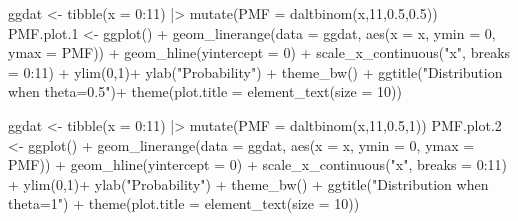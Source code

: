 \documentclass[
]{article}
\newenvironment{Shaded}{\begin{snugshade}}{\end{snugshade}}
\newcommand{\AttributeTok}[1]{\textcolor[rgb]{0.40,0.45,0.13}{#1}}
\newcommand{\DecValTok}[1]{\textcolor[rgb]{0.68,0.00,0.00}{#1}}
\newcommand{\FloatTok}[1]{\textcolor[rgb]{0.68,0.00,0.00}{#1}}
\newcommand{\FunctionTok}[1]{\textcolor[rgb]{0.28,0.35,0.67}{#1}}
\newcommand{\NormalTok}[1]{\textcolor[rgb]{0.00,0.23,0.31}{#1}}
\newcommand{\OtherTok}[1]{\textcolor[rgb]{0.00,0.23,0.31}{#1}}
\newcommand{\SpecialCharTok}[1]{\textcolor[rgb]{0.37,0.37,0.37}{#1}}
\newcommand{\StringTok}[1]{\textcolor[rgb]{0.13,0.47,0.30}{#1}}
\begin{document}
\begin{Shaded}
\begin{Highlighting}[numbers=left,,]
\NormalTok{ggdat }\OtherTok{\textless{}{-}} \FunctionTok{tibble}\NormalTok{(}\AttributeTok{x =} \DecValTok{0}\SpecialCharTok{:}\DecValTok{11}\NormalTok{) }\SpecialCharTok{|\textgreater{}}
  \FunctionTok{mutate}\NormalTok{(}\AttributeTok{PMF =} \FunctionTok{daltbinom}\NormalTok{(x,}\DecValTok{11}\NormalTok{,}\FloatTok{0.5}\NormalTok{,}\FloatTok{0.5}\NormalTok{))}
\NormalTok{PMF.plot}\FloatTok{.1} \OtherTok{\textless{}{-}} \FunctionTok{ggplot}\NormalTok{() }\SpecialCharTok{+}
  \FunctionTok{geom\_linerange}\NormalTok{(}\AttributeTok{data =}\NormalTok{ ggdat,}
                 \FunctionTok{aes}\NormalTok{(}\AttributeTok{x =}\NormalTok{ x, }\AttributeTok{ymin =} \DecValTok{0}\NormalTok{, }\AttributeTok{ymax =}\NormalTok{ PMF)) }\SpecialCharTok{+}
  \FunctionTok{geom\_hline}\NormalTok{(}\AttributeTok{yintercept =} \DecValTok{0}\NormalTok{) }\SpecialCharTok{+}
  \FunctionTok{scale\_x\_continuous}\NormalTok{(}\StringTok{"x"}\NormalTok{, }\AttributeTok{breaks =} \DecValTok{0}\SpecialCharTok{:}\DecValTok{11}\NormalTok{) }\SpecialCharTok{+}
  \FunctionTok{ylim}\NormalTok{(}\DecValTok{0}\NormalTok{,}\DecValTok{1}\NormalTok{)}\SpecialCharTok{+}
  \FunctionTok{ylab}\NormalTok{(}\StringTok{"Probability"}\NormalTok{) }\SpecialCharTok{+}
  \FunctionTok{theme\_bw}\NormalTok{() }\SpecialCharTok{+}
  \FunctionTok{ggtitle}\NormalTok{(}\StringTok{"Distribution when theta=0.5"}\NormalTok{)}\SpecialCharTok{+}
  \FunctionTok{theme}\NormalTok{(}\AttributeTok{plot.title =} \FunctionTok{element\_text}\NormalTok{(}\AttributeTok{size =} \DecValTok{10}\NormalTok{))}

\NormalTok{ggdat }\OtherTok{\textless{}{-}} \FunctionTok{tibble}\NormalTok{(}\AttributeTok{x =} \DecValTok{0}\SpecialCharTok{:}\DecValTok{11}\NormalTok{) }\SpecialCharTok{|\textgreater{}}
  \FunctionTok{mutate}\NormalTok{(}\AttributeTok{PMF =} \FunctionTok{daltbinom}\NormalTok{(x,}\DecValTok{11}\NormalTok{,}\FloatTok{0.5}\NormalTok{,}\DecValTok{1}\NormalTok{))}
\NormalTok{PMF.plot}\FloatTok{.2} \OtherTok{\textless{}{-}} \FunctionTok{ggplot}\NormalTok{() }\SpecialCharTok{+}
  \FunctionTok{geom\_linerange}\NormalTok{(}\AttributeTok{data =}\NormalTok{ ggdat,}
                 \FunctionTok{aes}\NormalTok{(}\AttributeTok{x =}\NormalTok{ x, }\AttributeTok{ymin =} \DecValTok{0}\NormalTok{, }\AttributeTok{ymax =}\NormalTok{ PMF)) }\SpecialCharTok{+}
  \FunctionTok{geom\_hline}\NormalTok{(}\AttributeTok{yintercept =} \DecValTok{0}\NormalTok{) }\SpecialCharTok{+}
  \FunctionTok{scale\_x\_continuous}\NormalTok{(}\StringTok{"x"}\NormalTok{, }\AttributeTok{breaks =} \DecValTok{0}\SpecialCharTok{:}\DecValTok{11}\NormalTok{) }\SpecialCharTok{+}
  \FunctionTok{ylim}\NormalTok{(}\DecValTok{0}\NormalTok{,}\DecValTok{1}\NormalTok{)}\SpecialCharTok{+}
  \FunctionTok{ylab}\NormalTok{(}\StringTok{"Probability"}\NormalTok{) }\SpecialCharTok{+}
  \FunctionTok{theme\_bw}\NormalTok{() }\SpecialCharTok{+}
  \FunctionTok{ggtitle}\NormalTok{(}\StringTok{"Distribution when theta=1"}\NormalTok{) }\SpecialCharTok{+}
  \FunctionTok{theme}\NormalTok{(}\AttributeTok{plot.title =} \FunctionTok{element\_text}\NormalTok{(}\AttributeTok{size =} \DecValTok{10}\NormalTok{))}


\end{Highlighting}
\end{Shaded}
\end{document}
